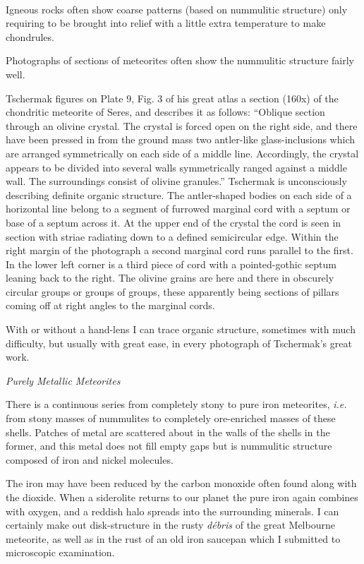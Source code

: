 \documentclass[a4paper, 12pt, oneside]{article}
\begin{document}
\paragraph{}
Igneous rocks often show coarse patterns (based on nummulitic structure) only requiring to be brought into relief with a little extra temperature to make chondrules.

Photographs of sections of meteorites often show the nummulitic structure fairly well.

Tschermak figures on Plate 9, Fig. 3 of his great atlas a section (160x) of the chondritic meteorite of Seres, and describes it as follows: ``Oblique section through an olivine crystal. The crystal is forced open on the right side, and there have been pressed in from the ground mass two antler-like glass-inclusions which are arranged symmetrically on each side of a middle line. Accordingly, the crystal appears to be divided into several walls symmetrically ranged against a middle wall. The surroundings consist of olivine granules.'' Tschermak is unconsciously describing definite organic structure. The antler-shaped bodies on each side of a horizontal line belong to a segment of furrowed marginal cord with a septum or base of a septum across it. At the upper end of the crystal the cord is seen in section with striae radiating down to a defined semicircular edge. Within the right margin of the photograph a second marginal cord runs parallel to the first. In the lower left corner is a third piece of cord with a pointed-gothic septum leaning back to the right. The olivine grains are here and there in obscurely circular groups or groups of groups, these apparently being sections of pillars coming off at right angles to the marginal cords.

With or without a hand-lens I can trace organic structure, sometimes with much difficulty, but usually with great ease, in every photograph of Tschermak's great work.

\bigskip
\centerline{\emph{Purely Metallic Meteorites}}

There is a continuous series from completely stony to pure iron meteorites, \emph{i.e.} from stony masses of nummulites to completely ore-enriched masses of these shells. Patches of metal are scattered about in the walls of the shells in the former, and this metal does not fill empty gaps but is nummulitic structure composed of iron and nickel molecules.

The iron may have been reduced by the carbon monoxide often found along with the dioxide. When a siderolite returns to our planet the pure iron again combines with oxygen, and a reddish halo spreads into the surrounding minerals. I can certainly make out disk-structure in the rusty \emph{débris} of the great Melbourne meteorite, as well as in the rust of an old iron saucepan which I submitted to microscopic examination.
\end{document}

